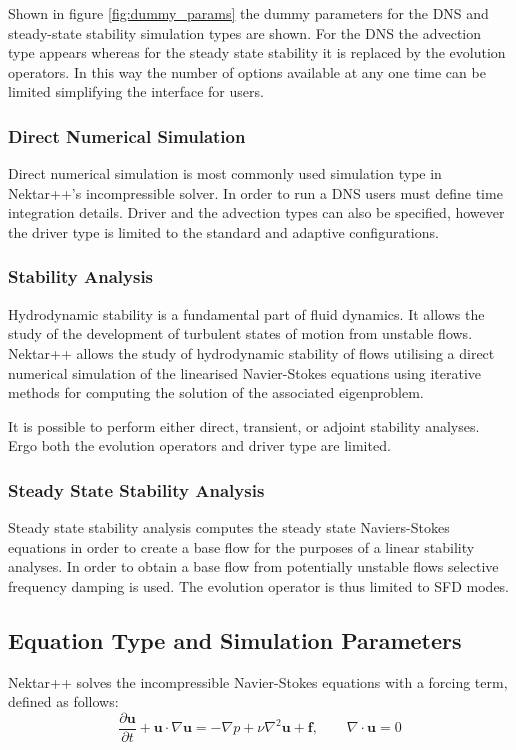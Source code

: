 \documentclass[11pt, a4paper]{report}
\begin{document}
Shown in figure \ref{fig:dummy_params} the dummy parameters for the DNS and steady-state stability simulation types are shown. For the DNS the advection type appears whereas for the steady state stability it is replaced by the evolution operators. In this way the number of options available at any one time can be limited simplifying the interface for users.

\subsubsection{Direct Numerical Simulation}
Direct numerical simulation is most commonly used simulation type in Nektar++'s incompressible solver. In order to run a DNS users must define time integration details. Driver and the advection types can also be specified, however the driver type is limited to the standard and adaptive configurations.

\subsubsection{Stability Analysis}
Hydrodynamic stability is a fundamental part of fluid dynamics. It allows the study of the development of turbulent states of motion from unstable flows. Nektar++ allows the study of  hydrodynamic stability of flows utilising a direct numerical simulation of the linearised Navier-Stokes equations using iterative methods for computing the solution of the associated eigenproblem.

It is possible to perform either direct, transient, or adjoint stability analyses. Ergo both the evolution operators and driver type are limited.

\subsubsection{Steady State Stability Analysis}
Steady state stability analysis computes the steady state Naviers-Stokes equations in order to create a base flow for the purposes of a linear stability analyses. In order to obtain a base flow from potentially unstable flows selective frequency damping is used. The evolution operator is thus limited to SFD modes.

\subsection{Equation Type and Simulation Parameters}
Nektar++ solves the incompressible Navier-Stokes equations with a forcing term, defined as follows:
\begin{equation}
\frac{\partial \mathbf{u}}{\partial t} + \mathbf{u} \cdot \nabla \mathbf{u} = - \nabla p + \nu \nabla^{2} \mathbf{u} + \mathbf{f}, \qquad \nabla \cdot \mathbf{u} = 0
\label{eq:IncNS}
\end{equation}
\end{document}

